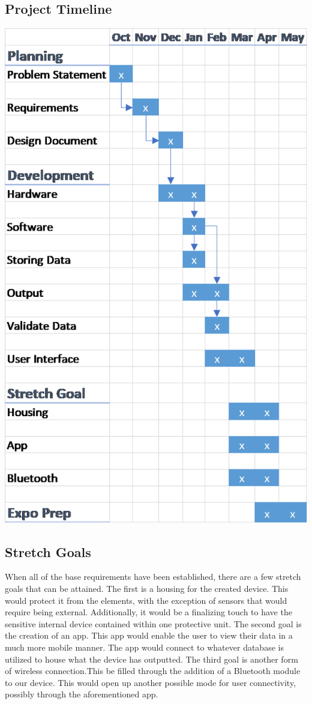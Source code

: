 \documentclass[IEEEtran,letterpaper,10pt,titlepage,fleqn,draftclsnofoot,onecolumn]{article}
\begin{document}
\subsection{Project Timeline}

\includegraphics{Gantt_Chart}

\subsection{Stretch Goals}

When all of the base requirements have been established, there are a few stretch goals that can be attained. The first is a housing for the created device. This would protect it from the elements, with the exception of sensors that would require being external. Additionally, it would be a finalizing touch to have the sensitive internal device contained within one protective unit. The second goal is the creation of an app. This app would enable the user to view their data in a much more mobile manner. The app would connect to whatever database is utilized to house what the device has outputted. The third goal is another form of wireless connection.This be filled through the addition of a Bluetooth module to our device. This would open up another possible mode for user connectivity, possibly through the aforementioned app.
\end{document}
